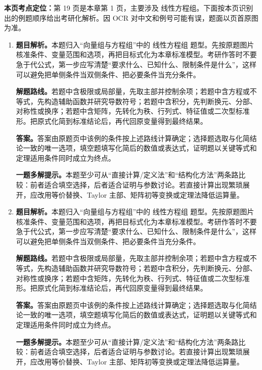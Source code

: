 \begin{solutionblock}
\textbf{本页考点定位：}第 19 页是本章第 1 页，主要涉及 线性方程组。下面按本页识别出的例题顺序给出考研化解析。因 OCR 对中文和例号可能有误，题面以页首原图为准。

\begin{enumerate}[label=\textbf{例\arabic*.}, leftmargin=2.4em]

\item \textbf{题目解析。}本题归入“向量组与方程组”中的 线性方程组 题型。先按原题图片核准条件、变量范围和选项，再把目标式化为本章标准模型。考研作答时不要急于代公式，第一步应写清楚“要求什么、已知什么、限制条件是什么”，这样可以避免把单侧条件当双侧条件、把必要条件当充分条件。

\textbf{解题路线。}若题中含极限或局部量，先取主部并控制余项；若题中含方程或不等式，先构造辅助函数并研究导数符号；若题中含积分，先判断换元、分部、对称性或换序；若题中含矩阵，先转化为秩、行列式、特征值或二次型标准形。把原式化简到标准结论后，再代回原变量得到最终结果。

\textbf{答案。}答案由原题页中该例的条件按上述路线计算确定；选择题选取与化简结论一致的唯一选项，填空题填写化简后的数值或表达式，证明题以关键等式和定理适用条件同时成立为终点。

\textbf{一题多解提示。}本题至少可从“直接计算/定义法”和“结构化方法”两条路比较：前者适合填空选择，后者适合证明与参数讨论。若直接计算出现繁琐展开，应改用等价替换、Taylor 主部、矩阵初等变换或定理法降低运算量。

\item \textbf{题目解析。}本题归入“向量组与方程组”中的 线性方程组 题型。先按原题图片核准条件、变量范围和选项，再把目标式化为本章标准模型。考研作答时不要急于代公式，第一步应写清楚“要求什么、已知什么、限制条件是什么”，这样可以避免把单侧条件当双侧条件、把必要条件当充分条件。

\textbf{解题路线。}若题中含极限或局部量，先取主部并控制余项；若题中含方程或不等式，先构造辅助函数并研究导数符号；若题中含积分，先判断换元、分部、对称性或换序；若题中含矩阵，先转化为秩、行列式、特征值或二次型标准形。把原式化简到标准结论后，再代回原变量得到最终结果。

\textbf{答案。}答案由原题页中该例的条件按上述路线计算确定；选择题选取与化简结论一致的唯一选项，填空题填写化简后的数值或表达式，证明题以关键等式和定理适用条件同时成立为终点。

\textbf{一题多解提示。}本题至少可从“直接计算/定义法”和“结构化方法”两条路比较：前者适合填空选择，后者适合证明与参数讨论。若直接计算出现繁琐展开，应改用等价替换、Taylor 主部、矩阵初等变换或定理法降低运算量。


\end{enumerate}
\end{solutionblock}
